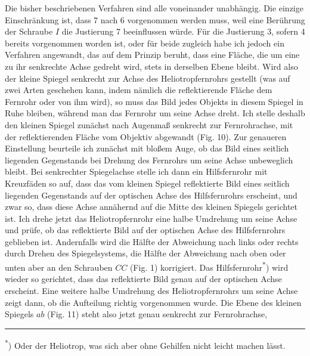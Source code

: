\par\noindent\hspace*{\parindent}Die bisher beschriebenen Verfahren sind alle voneinander unabhängig. Die einzige Einschränkung ist, dass 7 nach 6 vorgenommen werden muss, weil eine Berührung der Schraube $I$ die Justierung 7 beeinflussen würde. Für die Justierung 3, sofern 4 bereits vorgenommen worden ist, oder für beide zugleich habe ich jedoch ein Verfahren angewandt, das auf dem Prinzip beruht, dass eine Fläche, die um eine zu ihr senkrechte Achse gedreht wird, stets in derselben Ebene bleibt. Wird also der kleine Spiegel senkrecht zur Achse des Heliotropfernrohrs gestellt (was auf zwei Arten geschehen kann, indem nämlich die reflektierende Fläche dem Fernrohr  oder von ihm  wird), so muss das Bild jedes Objekts in diesem Spiegel in Ruhe bleiben, während man das Fernrohr um seine Achse dreht. Ich stelle deshalb den kleinen Spiegel zunächst nach Augenmaß senkrecht zur Fernrohrachse, mit der reflektierenden Fläche vom Objektiv abgewandt (Fig. 10). Zur genaueren Einstellung beurteile ich zunächst mit bloßem Auge, ob das Bild eines seitlich liegenden Gegenstands bei Drehung des Fernrohrs um seine Achse unbeweglich bleibt. Bei senkrechter Spiegelachse stelle ich dann ein Hilfsfernrohr mit Kreuzfäden so auf, dass das vom kleinen Spiegel reflektierte Bild eines seitlich liegenden Gegenstands auf der optischen Achse des Hilfsfernrohrs erscheint, und zwar so, dass diese Achse annähernd auf die Mitte des kleinen Spiegels gerichtet ist. Ich drehe jetzt das Heliotropfernrohr eine halbe Umdrehung um seine Achse und prüfe, ob das reflektierte Bild auf der optischen Achse des Hilfsfernrohrs geblieben ist. Andernfalls wird die Hälfte der Abweichung nach links oder rechts durch Drehen des Spiegelsystems, die Hälfte der Abweichung nach oben oder unten aber an den Schrauben $CC$ (Fig. 1) korrigiert. Das Hilfsfernrohr\textsuperscript{*}) wird wieder so gerichtet, dass das reflektierte Bild genau auf der optischen Achse erscheint. Eine weitere halbe Umdrehung des Heliotropfernrohrs um seine Achse zeigt dann, ob die Aufteilung richtig vorgenommen wurde. Die Ebene des kleinen Spiegels $ab$ (Fig. 11) steht also jetzt genau senkrecht zur Fernrohrachse,
\par\medskip\noindent\rule{4cm}{.4pt}\par
\begingroup\footnotesize\noindent\hspace*{\parindent}\textsuperscript{*}) Oder der Heliotrop, was sich aber ohne Gehilfen nicht leicht machen lässt.\par\endgroup
\par\medskip\noindent\makebox[.86\linewidth][r]{60\textsuperscript{*}}\par

